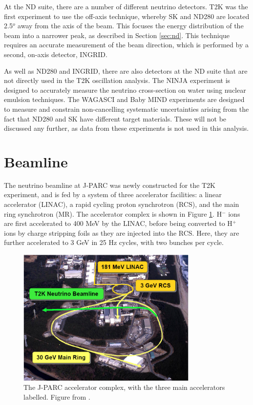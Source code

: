 At the ND suite, there are a number of different neutrino detectors. T2K was the first experiment to use the off-axis technique, whereby SK and ND280 are located 2.5$^o$ away from the axis of the beam. This focuses the energy distribution of the beam into a narrower peak, as described in Section \ref{sec:nd}. This technique requires an accurate measurement of the beam direction, which is performed by a second, on-axis detector, INGRID.

As well as ND280 and INGRID, there are also detectors at the ND suite that are not directly used in the T2K oscillation analysis. The NINJA\cite{ninja} experiment is designed to accurately measure the neutrino cross-section on water using nuclear emulsion techniques. The WAGASCI\cite{wagasci} and Baby MIND\cite{babymind} experiments are designed to measure and constrain non-cancelling systematic uncertainties arising from the fact that ND280 and SK have different target materials. These will not be discussed any further, as data from these experiments is not used in this analysis.

\section{Beamline}\label{sec:beam}

The neutrino beamline at J-PARC \cite{jparc} was newly constructed for the T2K experiment, and is fed by a system of three accelerator facilities: a linear accelerator (LINAC), a rapid cycling proton synchrotron (RCS), and the main ring synchrotron (MR). The accelerator complex is shown in Figure \ref{jparc}. H$^{-}$ ions are first accelerated to 400 MeV by the LINAC, before being converted to H$^{+}$ ions by charge stripping foils as they are injected into the RCS. Here, they are further accelerated to 3 GeV in 25 Hz cycles, with two bunches per cycle.

\begin{figure}[!htbp]
\centering
\includegraphics*[width=0.8\textwidth,clip]{figs/jparc}
\caption{The J-PARC accelerator complex, with the three main accelerators labelled. Figure from \cite{beamlinepic}.} \label{jparc}
\end{figure}

